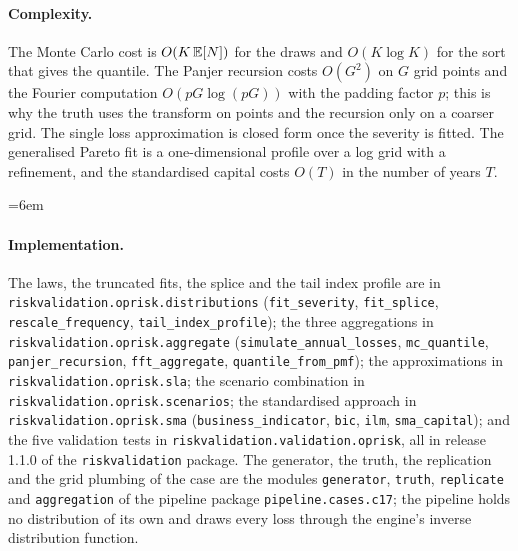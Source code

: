 \paragraph{Complexity.} The Monte Carlo cost is $O(K\,\mathbb{E}[N])$ for the draws and $O(K\log K)$ for the sort that gives the quantile. The Panjer
recursion costs $O(G^2)$ on $G$ grid points and the Fourier computation $O(pG\log(pG))$ with the padding factor $p$; this is why the truth uses
the transform on \opFftPoints{} points and the recursion only on a coarser grid. The single loss approximation is closed form once the severity
is fitted. The generalised Pareto fit is a one-dimensional profile over a log grid with a refinement, and the standardised capital costs
$O(T)$ in the number of years $T$.

\begingroup\emergencystretch=6em
\paragraph{Implementation.} The laws, the truncated fits, the splice and the tail index profile are in
\texttt{riskvalidation.\allowbreak oprisk.\allowbreak distributions} (\texttt{fit\_\allowbreak severity}, \texttt{fit\_\allowbreak splice}, \texttt{rescale\_\allowbreak frequency},
\texttt{tail\_\allowbreak index\_\allowbreak profile}); the three aggregations in \texttt{riskvalidation.\allowbreak oprisk.\allowbreak aggregate}
(\texttt{simulate\_\allowbreak annual\_\allowbreak losses}, \texttt{mc\_\allowbreak quantile}, \texttt{panjer\_\allowbreak recursion}, \texttt{fft\_\allowbreak aggregate},
\texttt{quantile\_\allowbreak from\_\allowbreak pmf}); the approximations in \texttt{riskvalidation.\allowbreak oprisk.\allowbreak sla}; the scenario combination in
\texttt{riskvalidation.\allowbreak oprisk.\allowbreak scenarios}; the standardised approach in \texttt{riskvalidation.\allowbreak oprisk.\allowbreak sma}
(\texttt{business\_\allowbreak indicator}, \texttt{bic}, \texttt{ilm}, \texttt{sma\_\allowbreak capital}); and the five validation tests in
\texttt{riskvalidation.\allowbreak validation.\allowbreak oprisk}, all in release 1.1.0 of the \texttt{riskvalidation} package. The generator, the truth, the replication
and the grid plumbing of the case are the modules \texttt{generator}, \texttt{truth}, \texttt{replicate} and \texttt{aggregation} of the
pipeline package \texttt{pipeline.cases.c17}; the pipeline holds no distribution of its own and draws every loss through the engine's
inverse distribution function.\par\endgroup

